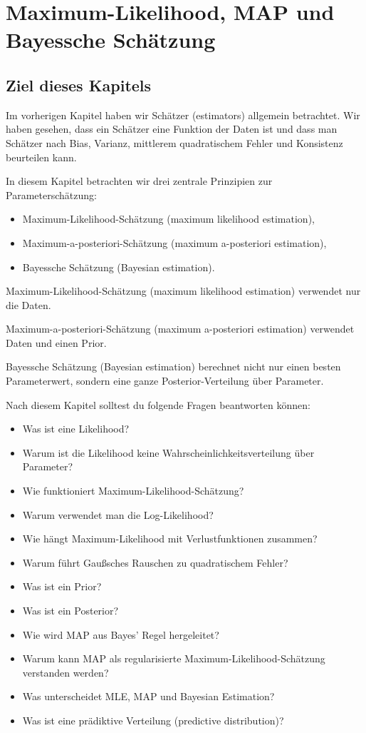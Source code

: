 \chapter{Maximum-Likelihood, MAP und Bayessche Schätzung}

\section{Ziel dieses Kapitels}

Im vorherigen Kapitel haben wir Schätzer (estimators) allgemein betrachtet.
Wir haben gesehen, dass ein Schätzer eine Funktion der Daten ist und dass man Schätzer nach Bias, Varianz, mittlerem quadratischem Fehler und Konsistenz beurteilen kann.

In diesem Kapitel betrachten wir drei zentrale Prinzipien zur Parameterschätzung:

\begin{itemize}
    \item Maximum-Likelihood-Schätzung (maximum likelihood estimation),
    \item Maximum-a-posteriori-Schätzung (maximum a-posteriori estimation),
    \item Bayessche Schätzung (Bayesian estimation).
\end{itemize}

\begin{conceptbox}
Maximum-Likelihood-Schätzung (maximum likelihood estimation) verwendet nur die Daten.

Maximum-a-posteriori-Schätzung (maximum a-posteriori estimation) verwendet Daten und einen Prior.

Bayessche Schätzung (Bayesian estimation) berechnet nicht nur einen besten Parameterwert, sondern eine ganze Posterior-Verteilung über Parameter.
\end{conceptbox}

Nach diesem Kapitel solltest du folgende Fragen beantworten können:

\begin{itemize}
    \item Was ist eine Likelihood?
    \item Warum ist die Likelihood keine Wahrscheinlichkeitsverteilung über Parameter?
    \item Wie funktioniert Maximum-Likelihood-Schätzung?
    \item Warum verwendet man die Log-Likelihood?
    \item Wie hängt Maximum-Likelihood mit Verlustfunktionen zusammen?
    \item Warum führt Gaußsches Rauschen zu quadratischem Fehler?
    \item Was ist ein Prior?
    \item Was ist ein Posterior?
    \item Wie wird MAP aus Bayes' Regel hergeleitet?
    \item Warum kann MAP als regularisierte Maximum-Likelihood-Schätzung verstanden werden?
    \item Was unterscheidet MLE, MAP und Bayesian Estimation?
    \item Was ist eine prädiktive Verteilung (predictive distribution)?
\end{itemize}

